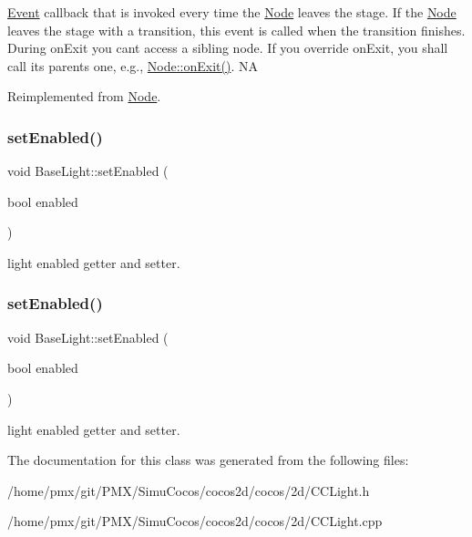 \hyperlink{classEvent}{Event} callback that is invoked every time the \hyperlink{classNode}{Node} leaves the \textquotesingle{}stage\textquotesingle{}. If the \hyperlink{classNode}{Node} leaves the \textquotesingle{}stage\textquotesingle{} with a transition, this event is called when the transition finishes. During on\+Exit you can\textquotesingle{}t access a sibling node. If you override on\+Exit, you shall call its parent\textquotesingle{}s one, e.\+g., \hyperlink{classNode_ac83de835ea315e3179d4293acd8903ac}{Node\+::on\+Exit()}.  NA 

Reimplemented from \hyperlink{classNode_ac83de835ea315e3179d4293acd8903ac}{Node}.

\mbox{\label{classBaseLight_af3da106fbf57edbbfc9ca20319311bb6}} 
\subsubsection{\texorpdfstring{set\+Enabled()}{setEnabled()}\hspace{0.1cm}{\footnotesize\ttfamily [1/2]}}
{\footnotesize\ttfamily void Base\+Light\+::set\+Enabled (\begin{DoxyParamCaption}\item[{bool}]{enabled }\end{DoxyParamCaption})\hspace{0.3cm}{\ttfamily [inline]}}

light enabled getter and setter. \mbox{\label{classBaseLight_af3da106fbf57edbbfc9ca20319311bb6}} 
\subsubsection{\texorpdfstring{set\+Enabled()}{setEnabled()}\hspace{0.1cm}{\footnotesize\ttfamily [2/2]}}
{\footnotesize\ttfamily void Base\+Light\+::set\+Enabled (\begin{DoxyParamCaption}\item[{bool}]{enabled }\end{DoxyParamCaption})\hspace{0.3cm}{\ttfamily [inline]}}

light enabled getter and setter. 

The documentation for this class was generated from the following files\+:\begin{DoxyCompactItemize}
\item 
/home/pmx/git/\+P\+M\+X/\+Simu\+Cocos/cocos2d/cocos/2d/C\+C\+Light.\+h\item 
/home/pmx/git/\+P\+M\+X/\+Simu\+Cocos/cocos2d/cocos/2d/C\+C\+Light.\+cpp\end{DoxyCompactItemize}
